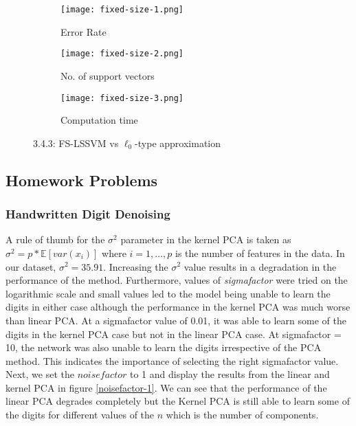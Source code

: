\documentclass[paper=a4, fontsize=11pt]{scrartcl} %
\numberwithin{equation}{section} %
\begin{document}
\begin{figure}[ht]
\centering
	\begin{subfigure}[b]{0.3\textwidth}
		\centering
		\texttt{[image: fixed-size-1.png]}
		\caption{Error Rate}
	\end{subfigure}%
	\begin{subfigure}[b]{0.3\textwidth}
		\centering
		\texttt{[image: fixed-size-2.png]}
		\caption{No. of support vectors}
	\end{subfigure}%
	\begin{subfigure}[b]{0.3\textwidth}
		\centering
		\texttt{[image: fixed-size-3.png]}
		\caption{Computation time}
	\end{subfigure}
\caption{3.4.3: FS-LSSVM vs $\ell_0$-type approximation}
\label{fixed-size}
\end{figure}

\subsection{Homework Problems}

\subsubsection{Handwritten Digit Denoising}

A rule of thumb for the $\sigma^2$ parameter in the kernel PCA is taken as $\sigma^2 = p * \mathbb{E}[var(x_i)]$ where $i = 1, \ldots, p$ is the number of features in the data. In our dataset, $\sigma^2 = 35.91$. Increasing the $\sigma^2$ value results in a degradation in the performance of the method. Furthermore, values of \textit{sigmafactor} were tried on the logarithmic scale and small values led to the model being unable to learn the digits in either case although the performance in the kernel PCA was much worse than linear PCA. At a sigmafactor value of 0.01, it was able to learn some of the digits in the kernel PCA case but not in the linear PCA case. At sigmafactor = 10, the network was also unable to learn the digits irrespective of the PCA method. This indicates the importance of selecting the right sigmafactor value. Next, we set the $noisefactor$ to 1 and display the results from the linear and kernel PCA in figure \ref{noisefactor-1}. We can see that the performance of the linear PCA degrades completely but the Kernel PCA is still able to learn some of the digits for different values of the $n$ which is the number of components.
\end{document}
